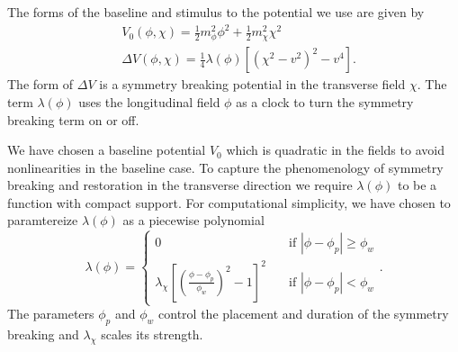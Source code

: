 The forms of the baseline and stimulus to the potential we use are given by
\begin{align} \label{eq:potential}
  &V_0(\phi,\chi) = \frac{1}{2}m^2_\phi\phi^2 + \frac{1}{2}m^2_\chi\chi^2 \\
  &\Delta V(\phi,\chi) = \frac{1}{4}\lambda(\phi)\left[ (\chi^2-v^2)^2 - v^4 \right].
\end{align}
The form of $\Delta V$ is a symmetry breaking potential in the transverse field $\chi$. The term $\lambda(\phi)$ uses the longitudinal field $\phi$ as a clock to turn the symmetry breaking term on or off.

We have chosen a baseline potential $V_0$ which is quadratic in the fields to avoid nonlinearities in the baseline case.
To capture the phenomenology of symmetry breaking and restoration in the transverse direction we require $\lambda(\phi)$ to be a function with compact support.
For computational simplicity, we have chosen to paramtereize $\lambda(\phi)$ as a piecewise polynomial
\begin{equation} \label{eq:lambda}
  \lambda(\phi) =
  \begin{cases}
    0 & \quad \text{if } |\phi-\phi_p|\ge\phi_w \\
    \lambda_\chi\left[\left(\frac{\phi-\phi_p}{\phi_w}\right)^2 - 1 \right]^2 & \quad \text{if  } |\phi-\phi_p|<\phi_w
  \end{cases}.
\end{equation}
The parameters $\phi_p$ and $\phi_w$ control the placement and duration of the symmetry breaking and $\lambda_\chi$
scales its strength.


